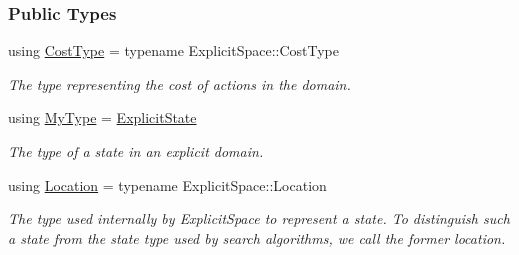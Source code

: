\subsubsection*{Public Types}
\begin{DoxyCompactItemize}
\item 
using \hyperlink{structslb_1_1core_1_1sb_1_1ExplicitState_ae36e0763ad9b7ee7407aa316d4c64f14}{Cost\+Type} = typename Explicit\+Space\+::\+Cost\+Type\hypertarget{structslb_1_1core_1_1sb_1_1ExplicitState_ae36e0763ad9b7ee7407aa316d4c64f14}{}\label{structslb_1_1core_1_1sb_1_1ExplicitState_ae36e0763ad9b7ee7407aa316d4c64f14}

\begin{DoxyCompactList}\small\item\em The type representing the cost of actions in the domain. \end{DoxyCompactList}\item 
using \hyperlink{structslb_1_1core_1_1sb_1_1ExplicitState_ac92f2c174f45d0fd4276916906b4e8b7}{My\+Type} = \hyperlink{structslb_1_1core_1_1sb_1_1ExplicitState}{Explicit\+State}\hypertarget{structslb_1_1core_1_1sb_1_1ExplicitState_ac92f2c174f45d0fd4276916906b4e8b7}{}\label{structslb_1_1core_1_1sb_1_1ExplicitState_ac92f2c174f45d0fd4276916906b4e8b7}

\begin{DoxyCompactList}\small\item\em The type of a state in an explicit domain. \end{DoxyCompactList}\item 
using \hyperlink{structslb_1_1core_1_1sb_1_1ExplicitState_a0db984d44f46c477a6df3c9b062925f9}{Location} = typename Explicit\+Space\+::\+Location\hypertarget{structslb_1_1core_1_1sb_1_1ExplicitState_a0db984d44f46c477a6df3c9b062925f9}{}\label{structslb_1_1core_1_1sb_1_1ExplicitState_a0db984d44f46c477a6df3c9b062925f9}

\begin{DoxyCompactList}\small\item\em The type used internally by {\ttfamily Explicit\+Space} to represent a state. To distinguish such a state from the state type used by search algorithms, we call the former {\ttfamily location}. \end{DoxyCompactList}\end{DoxyCompactItemize}
